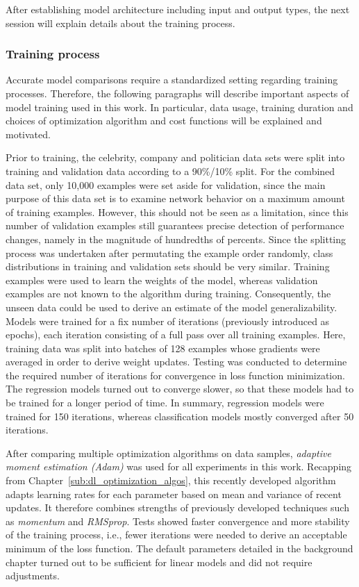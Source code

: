 After establishing model architecture including input and output types, the next
session will explain details about the training process.

\subsubsection{Training process}
\label{sub:lin_training}

Accurate model comparisons require a standardized setting regarding training
processes.
Therefore, the following paragraphs will describe important aspects of model training
used in this work.
In particular, data usage, training duration and choices of optimization
algorithm and cost functions will be explained and motivated.

Prior to training, the celebrity, company and politician data sets were split into 
training and validation data according to a 90\%/10\% split.
For the combined data set, only 10,000 examples were set aside for validation,
since the main purpose of this data set is to examine network behavior on a
maximum amount of training examples.
However, this should not be seen as a limitation, since this number of validation
examples still guarantees precise detection of performance changes, namely
in the magnitude of hundredths of percents.
Since the splitting process was undertaken after permutating the example order
randomly, class distributions in training and validation sets should be very
similar.
Training examples were used to learn the weights of the model, whereas validation
examples are not known to the algorithm during training.
Consequently, the unseen data could be used to derive an estimate of the model
generalizability.
Models were trained for a fix number of iterations (previously introduced as epochs), each iteration consisting
of a full pass over all training examples.
Here, training data was split into batches of 128 examples whose gradients
were averaged in order to derive weight updates.
Testing was conducted to determine the required number of iterations for
convergence in loss function minimization.
The regression models turned out to converge slower, so that these models
had to be trained for a longer period of time.
In summary, regression models were trained for 150 iterations, whereas classification
models mostly converged after 50 iterations.

After comparing multiple optimization algorithms on data samples, \textit{adaptive
moment estimation (Adam)} was used for all experiments in this work.
Recapping from Chapter~\ref{sub:dl_optimization_algos}, this recently developed
algorithm adapts learning rates for each parameter based on mean and variance of
recent updates.
It therefore combines strengths of previously developed techniques such as
\textit{momentum} and \textit{RMSprop}.
Tests showed faster convergence and more stability of the training process, i.e.,
fewer iterations were needed to derive an acceptable minimum of the loss function.
The default parameters detailed in the background chapter turned out to be sufficient
for linear models and did not require adjustments.

